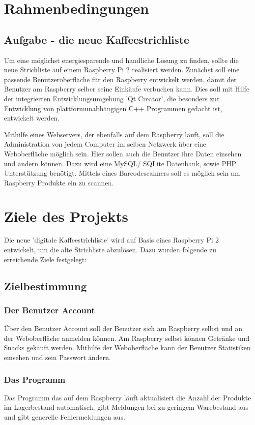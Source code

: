 \documentclass[11pt,a4paper]{article} %
\begin{document}
\section{Rahmenbedingungen}


\subsection{Aufgabe - die neue Kaffeestrichliste}
\label{SchriftAnpassen}

Um eine möglichst energiesparende und handliche Lösung zu finden, sollte die neue Strichliste auf einem Raspberry Pi 2 realisiert werden. Zunächst soll eine passende Benutzeroberfläche für den Raspberry entwickelt werden, damit der Benutzer am Raspberry selber seine Einkäufe verbuchen kann. Dies soll mit Hilfe der integrierten Entwicklungsumgebung 'Qt Creator', die besonders zur Entwicklung von plattformunabhängigen C++ Programmen gedacht ist, entwickelt werden.
\par
Mithilfe eines Webservers, der ebenfalls auf dem Raspberry läuft, soll die Administration von jedem Computer im selben Netzwerk über eine Weboberfläche möglich sein. Hier sollen auch die Benutzer ihre Daten einsehen und ändern können. Dazu wird eine MySQL/ SQLite Datenbank, sowie PHP Unterstützung benötigt. Mittels eines Barcodescanners soll es möglich sein am Raspberry Produkte ein zu scannen.


\section{Ziele des Projekts}
Die neue 'digitale Kaffeestrichliste' wird auf Basis eines Raspberry Pi 2 entwickelt, um die alte Strichliste abzulösen. Dazu wurden folgende zu erreichende Ziele festgelegt:
\subsection{Zielbestimmung}
\label{Ausrichtung}

\subsubsection{Der Benutzer Account}
\"Uber den Benutzer Account soll der Benutzer sich am Raspberry selbst und an der Weboberfläche anmelden können. Am Raspberry selbst können Getränke und Snacks gekauft werden. Mithilfe der Weboberfläche kann der Benutzer Statistiken einsehen und sein Passwort ändern.

\subsubsection{Das Programm}
Das Programm das auf dem Raspberry läuft aktualisiert die Anzahl der Produkte im Lagerbestand automatisch, gibt Meldungen bei zu geringem Warebestand aus und gibt generelle Fehlermeldungen aus.
\end{document}
